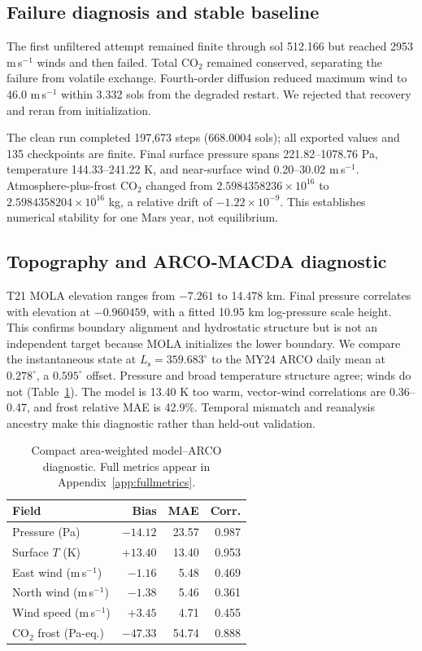 \documentclass{article}
\newcommand{\Ls}{L_\mathrm{s}}
\begin{document}
\subsection{Failure diagnosis and stable baseline}
The first unfiltered attempt remained finite through sol 512.166 but reached
2953 m\,s\(^{-1}\) winds and then failed. Total \(\mathrm{CO_2}\) remained
conserved, separating the failure from volatile exchange. Fourth-order diffusion
reduced maximum wind to 46.0 m\,s\(^{-1}\) within 3.332 sols from the degraded
restart. We rejected that recovery and reran from initialization.

The clean run completed 197,673 steps (668.0004 sols); all exported values and
135 checkpoints are finite. Final surface pressure spans 221.82--1078.76 Pa,
temperature 144.33--241.22 K, and near-surface wind 0.20--30.02 m\,s\(^{-1}\).
Atmosphere-plus-frost \(\mathrm{CO_2}\) changed from
\(2.5984358236\times10^{16}\) to \(2.5984358204\times10^{16}\) kg, a relative
drift of \(-1.22\times10^{-9}\). This establishes numerical stability for one
Mars year, not equilibrium.

\subsection{Topography and ARCO-MACDA diagnostic}
T21 MOLA elevation ranges from \(-7.261\) to 14.478 km. Final pressure correlates
with elevation at \(-0.960459\), with a fitted 10.95 km log-pressure scale
height. This confirms boundary alignment and hydrostatic structure but is not an
independent target because MOLA initializes the lower boundary. We compare the
instantaneous state at \(\Ls=359.683^\circ\) to the MY24
ARCO daily mean at \(0.278^\circ\), a \(0.595^\circ\) offset. Pressure and broad
temperature structure agree; winds do not (Table~\ref{tab:arco}). The model is
13.40 K too warm, vector-wind correlations are 0.36--0.47, and frost relative
MAE is 42.9\%. Temporal mismatch and reanalysis ancestry make this diagnostic
rather than held-out validation.

\begin{table}[t]\centering\small
\caption{Compact area-weighted model--ARCO diagnostic. Full metrics appear in
Appendix~\ref{app:fullmetrics}.}\label{tab:arco}
\begin{tabular}{lrrr}\toprule
Field & Bias & MAE & Corr.\\\midrule
Pressure (Pa) & \(-14.12\)&23.57&0.987\\
Surface \(T\) (K) & \(+13.40\)&13.40&0.953\\
East wind (m\,s\(^{-1}\)) & \(-1.16\)&5.48&0.469\\
North wind (m\,s\(^{-1}\)) & \(-1.38\)&5.46&0.361\\
Wind speed (m\,s\(^{-1}\)) & \(+3.45\)&4.71&0.455\\
CO\(_2\) frost (Pa-eq.) & \(-47.33\)&54.74&0.888\\\bottomrule
\end{tabular}
\end{table}
\end{document}
